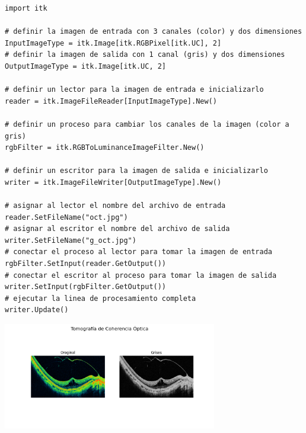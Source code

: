 \documentclass{article}
\begin{document}
\begin{lstlisting}[style=mystyle2]
import itk

# definir la imagen de entrada con 3 canales (color) y dos dimensiones
InputImageType = itk.Image[itk.RGBPixel[itk.UC], 2]
# definir la imagen de salida con 1 canal (gris) y dos dimensiones
OutputImageType = itk.Image[itk.UC, 2]

# definir un lector para la imagen de entrada e inicializarlo
reader = itk.ImageFileReader[InputImageType].New()

# definir un proceso para cambiar los canales de la imagen (color a gris)
rgbFilter = itk.RGBToLuminanceImageFilter.New()

# definir un escritor para la imagen de salida e inicializarlo
writer = itk.ImageFileWriter[OutputImageType].New()

# asignar al lector el nombre del archivo de entrada
reader.SetFileName("oct.jpg")
# asignar al escritor el nombre del archivo de salida
writer.SetFileName("g_oct.jpg")
# conectar el proceso al lector para tomar la imagen de entrada
rgbFilter.SetInput(reader.GetOutput())
# conectar el escritor al proceso para tomar la imagen de salida
writer.SetInput(rgbFilter.GetOutput())
# ejecutar la linea de procesamiento completa
writer.Update()

\end{lstlisting}
\begin{minipage}{\linewidth}
  \centering
  \includegraphics[width=0.7\textwidth]{imgs/oct.png}
  \label{referenciarImagenAca}
\end{minipage}
\end{document}
